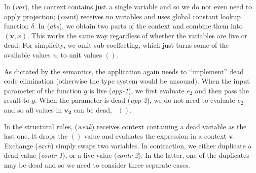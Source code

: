 In (\emph{var}), the context contains just a single variable and so we do not even need to apply
projection; (\emph{cosnt}) receives no variables and uses global constant lookup function $\delta$.
In (\emph{abs}), we obtain two parts of the context and combine them into $(\mathbf{v}, x)$. This
works the same way regardless of whether the variables are live or dead. For simplicity, we omit
sub-coeffecting, which just turns some of the available values $v_i$ to unit values $()$.

As dictated by the semantics, the application again needs to ``implement'' dead code elimination
(otherwise the type system would be unsound). When the input parameter of the function $g$ is live 
(\emph{app-1}), we first evaluate $e_2$ and then pass the result to $g$. When the parameter is 
dead (\emph{app-2}), we do not need to evaluate $e_2$ and so all values in $\mathbf{v_2}$ can be 
dead, \ie~$()$.

In the structural rules, (\emph{weak}) receives context containing a dead variable as the last one.
It drops the $()$ value and evaluates the expression in a context $\mathbf{v}$. Exchange (\emph{exch})
simply swaps two variables. In contraction, we either duplicate a dead value (\emph{contr-1}),
or a live value (\emph{contr-2}). In the latter, one of the duplicates may be dead and 
so we need to consider three separate cases.


